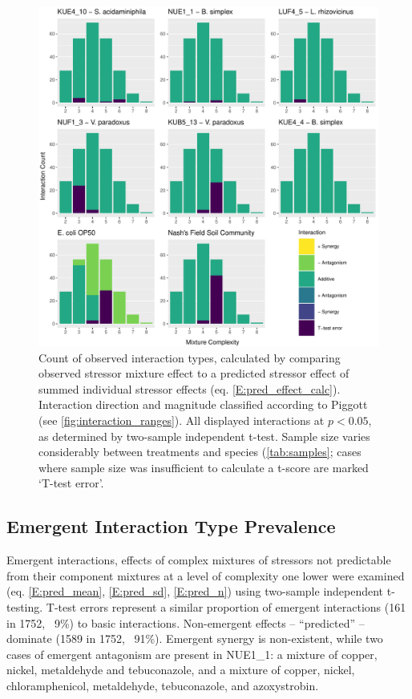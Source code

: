 \documentclass[10pt]{article}
\begin{document}
\begin{figure}[hb]
    \centering
    \includegraphics[width = \textwidth]{Scripts/Results/Final_Pipeline/histogram_interaction_basic.pdf}
    \caption{Count of observed interaction types, calculated by comparing observed stressor mixture effect to a predicted stressor effect of summed individual stressor effects (eq. \ref{E:pred_effect_calc}). Interaction direction and magnitude classified according to Piggott \cite{Piggott2015} (see \cref{fig:interaction_ranges}). All displayed interactions at $p < 0.05$, as determined by two-sample independent t-test. Sample size varies considerably between treatments and species (\cref{tab:samples}; cases where sample size was insufficient to calculate a t-score are marked `T-test error'.}
    \label{fig:histogram_interaction_basic}
\end{figure}

\newpage
\subsection{Emergent Interaction Type Prevalence}
\label{S:3:8}

Emergent interactions, effects of complex mixtures of stressors not predictable from their component mixtures at a level of complexity one lower were examined (eq. \ref{E:pred_mean}, \ref{E:pred_sd}, \ref{E:pred_n}) using two-sample independent t-testing. T-test errors represent a similar proportion of emergent interactions (161 in 1752, ~9\%) to basic interactions. Non-emergent effects – “predicted” – dominate (1589 in 1752, ~91\%). Emergent synergy is non-existent, while two cases of emergent antagonism are present in NUE1\_1: a mixture of copper, nickel, metaldehyde and tebuconazole, and a mixture of copper, nickel, chloramphenicol, metaldehyde, tebuconazole, and azoxystrobin.
\end{document}
